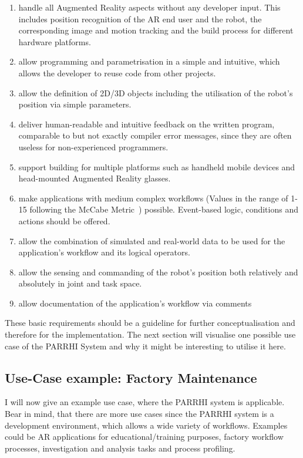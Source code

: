 \begin{enumerate}
	\setlength\itemsep{-1em}
	\item handle all Augmented Reality aspects without any developer input. This includes position recognition of the AR end user and the robot, the corresponding image and motion tracking and the build process for different hardware platforms.
	\item allow programming and parametrisation in a simple and intuitive, which allows the developer to reuse code from other projects.
	\item allow the definition of 2D/3D objects including the utilisation of the robot's position via simple parameters.
	\item deliver human-readable and intuitive feedback on the written program, comparable to but not exactly compiler error messages, since they are often useless for non-experienced programmers.
	\item support building for multiple platforms such as handheld mobile devices and head-mounted Augmented Reality glasses.
	\item make applications with medium complex workflows (Values in the range of 1-15 following the McCabe Metric~\cite{mccabe1976complexity}) possible. Event-based logic, conditions and actions should be offered.
	\item allow the combination of simulated and real-world data to be used for the application's workflow and its logical operators.
	\item allow the sensing and commanding of the robot's position both relatively and absolutely in joint and task space.
	\item allow documentation of the application's workflow via comments
\end{enumerate}

These basic requirements should be a guideline for further conceptualisation and therefore for the implementation. The next section will visualise one possible use case of the PARRHI System and why it might be interesting to utilise it here.

\subsection{Use-Case example: Factory Maintenance} \label{Section:UseCaseDefinition}

I will now give an example use case, where the PARRHI system is applicable. Bear in mind, that there are more use cases since the PARRHI system is a development environment, which allows a wide variety of workflows. Examples could be AR applications for educational/training purposes, factory workflow processes, investigation and analysis tasks and process profiling.

